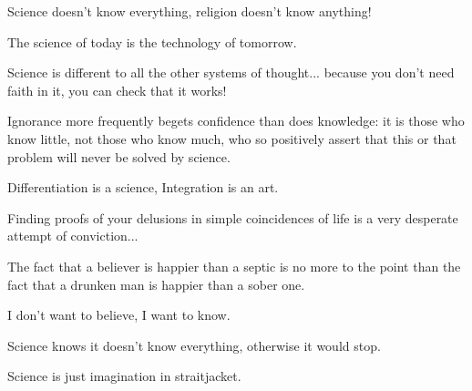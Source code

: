  	\begin{fuquote}Science doesn't know everything, religion doesn't know anything!
 	\end{fuquote}
 	
 	 \begin{fuquote}The science of today is the technology of tomorrow.
 	\end{fuquote}
 	
 	 \begin{fuquote}Science is different to all the other systems of thought... because you don't need faith in it, you can check that it works!
 	\end{fuquote}
 	
 	\begin{fuquote}Ignorance more frequently begets confidence than does knowledge: it is those who know little, not those who know much, who so positively assert that this or that problem will never be solved by science.
 	\end{fuquote}
 	
 	\begin{fuquote}[?]Differentiation is a science, Integration is an art.
 	\end{fuquote}
 	
 	\begin{fuquote}Finding proofs of your delusions in simple coincidences of life is a very desperate attempt of conviction...
 	\end{fuquote}
 	
 	\begin{fuquote}The fact that a believer is happier than a septic is no more to the point than the fact that a drunken man is happier than a sober one.
 	\end{fuquote}
 	
 	\begin{fuquote}I don't want to believe, I want to know.
 	\end{fuquote}
 	
 	\begin{fuquote}Science knows it doesn't know everything, otherwise it would stop.
 	\end{fuquote}
 	
 	 \begin{fuquote}Science is just imagination in straitjacket.
 	\end{fuquote}
 	
